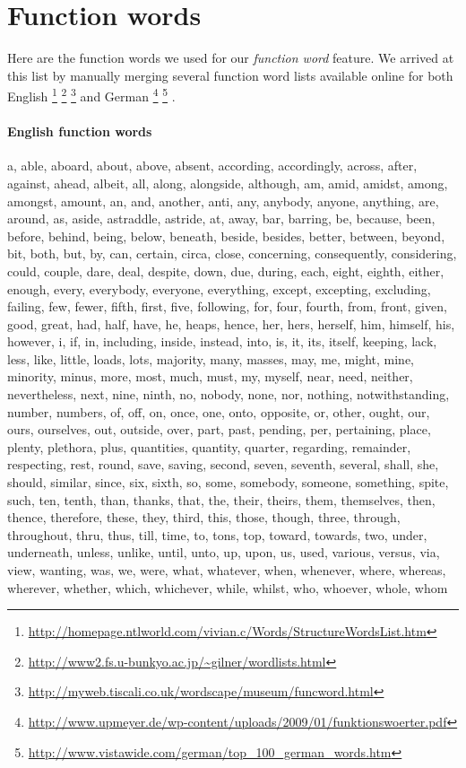 
\section{Function words}
\label{sec:app_function_words}
Here are the function words we used for our \textit{function word} feature. We arrived at this list by manually merging several function word lists available online for both English
\footnote{\url{http://homepage.ntlworld.com/vivian.c/Words/StructureWordsList.htm}}
\footnote{\url{http://www2.fs.u-bunkyo.ac.jp/~gilner/wordlists.html}}
\footnote{\url{http://myweb.tiscali.co.uk/wordscape/museum/funcword.html}}
and German
\footnote{\url{http://www.upmeyer.de/wp-content/uploads/2009/01/funktionswoerter.pdf}}
\footnote{\url{http://www.vistawide.com/german/top_100_german_words.htm}}
.


\paragraph{English function words}
a, able, aboard, about, above, absent, according, accordingly, across, after, against, ahead, albeit, all, along, alongside, although, am, amid, amidst, among, amongst, amount, an, and, another, anti, any, anybody, anyone, anything, are, around, as, aside, astraddle, astride, at, away, bar, barring, be, because, been, before, behind, being, below, beneath, beside, besides, better, between, beyond, bit, both, but, by, can, certain, circa, close, concerning, consequently, considering, could, couple, dare, deal, despite, down, due, during, each, eight, eighth, either, enough, every, everybody, everyone, everything, except, excepting, excluding, failing, few, fewer, fifth, first, five, following, for, four, fourth, from, front, given, good, great, had, half, have, he, heaps, hence, her, hers, herself, him, himself, his, however, i, if, in, including, inside, instead, into, is, it, its, itself, keeping, lack, less, like, little, loads, lots, majority, many, masses, may, me, might, mine, minority, minus, more, most, much, must, my, myself, near, need, neither, nevertheless, next, nine, ninth, no, nobody, none, nor, nothing, notwithstanding, number, numbers, of, off, on, once, one, onto, opposite, or, other, ought, our, ours, ourselves, out, outside, over, part, past, pending, per, pertaining, place, plenty, plethora, plus, quantities, quantity, quarter, regarding, remainder, respecting, rest, round, save, saving, second, seven, seventh, several, shall, she, should, similar, since, six, sixth, so, some, somebody, someone, something, spite, such, ten, tenth, than, thanks, that, the, their, theirs, them, themselves, then, thence, therefore, these, they, third, this, those, though, three, through, throughout, thru, thus, till, time, to, tons, top, toward, towards, two, under, underneath, unless, unlike, until, unto, up, upon, us, used, various, versus, via, view, wanting, was, we, were, what, whatever, when, whenever, where, whereas, wherever, whether, which, whichever, while, whilst, who, whoever, whole, whom


